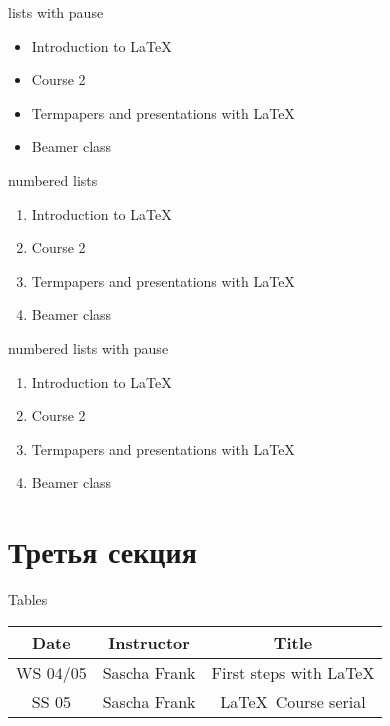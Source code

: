 \documentclass{beamer}
\begin{document}
\begin{frame}{lists with pause}
\begin{itemize}
\item Introduction to  \LaTeX \pause 
\item Course 2 \pause 
\item Termpapers and presentations with \LaTeX \pause 
\item Beamer class
\end{itemize} 
\end{frame}


\begin{frame}{numbered lists}
\begin{enumerate}
\item Introduction to  \LaTeX  
\item Course 2 
\item Termpapers and presentations with \LaTeX 
\item Beamer class
\end{enumerate}
\end{frame}


\begin{frame}{numbered lists with pause}
\begin{enumerate}
\item Introduction to  \LaTeX \pause 
\item Course 2 \pause 
\item Termpapers and presentations with \LaTeX \pause 
\item Beamer class
\end{enumerate}
\end{frame}


\section{Третья секция} 
\begin{frame}{Tables}
\begin{tabular}{|c|c|c|}
\hline
\textbf{Date} & \textbf{Instructor} & \textbf{Title} \\
\hline
WS 04/05 & Sascha Frank & First steps with  \LaTeX  \\
\hline
SS 05 & Sascha Frank & \LaTeX \ Course serial \\
\hline
\end{tabular}
\end{frame}
\end{document}

